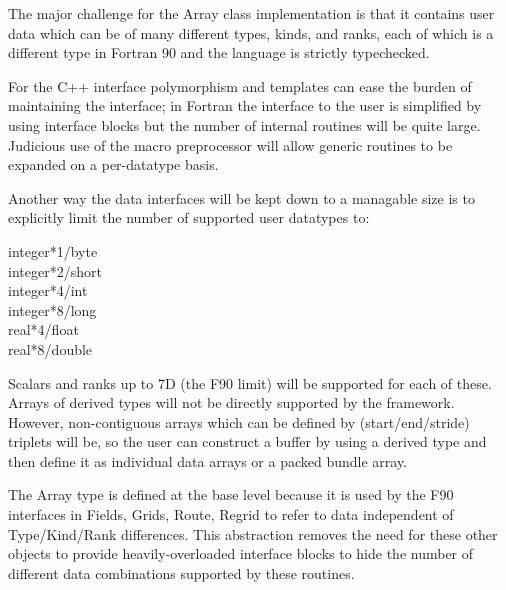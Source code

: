The major challenge for the Array class implementation is that it 
contains user data which can be of many different types, kinds,
and ranks, each of which is a different type in Fortran 90 and
the language is strictly typechecked.

For the C++ interface polymorphism and templates can ease the burden of 
maintaining the interface; in Fortran the interface to the user
is simplified by using interface blocks but the number of internal
routines will be quite large.  Judicious use of the macro preprocessor
will allow generic routines to be expanded on a per-datatype basis.

Another way the data interfaces will be kept down to a managable
size is to explicitly limit the number of supported user datatypes to:
\begin{description}
\item[integer*1/byte]
\item[integer*2/short]
\item[integer*4/int]
\item[integer*8/long]
\item[real*4/float]
\item[real*8/double]
\end{description}

Scalars and ranks up to 7D (the F90 limit)
will be supported for each of these.
Arrays of derived types will not be directly supported by the framework.
However, non-contiguous arrays which can be defined by (start/end/stride)
triplets will be, so the user can construct a buffer by using a derived
type and then define it as 
individual data arrays or a packed bundle array.

The Array type is defined at the base level because it is used by the
F90 interfaces in Fields, Grids, Route, Regrid to refer to data 
independent of Type/Kind/Rank differences.  This abstraction removes
the need for these other objects to provide
heavily-overloaded interface blocks to hide the number of
different data combinations supported by these routines.

